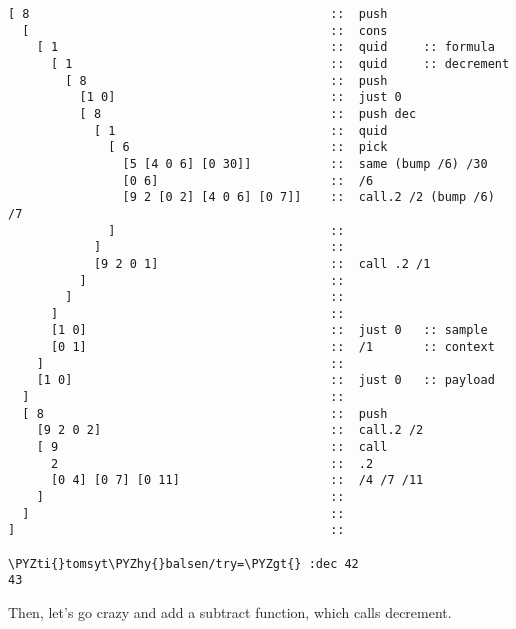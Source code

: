 \begin{framed_shaded}
\begin{Verbatim}[fontsize=\relsize{-2.5},fontseries=b,commandchars=\\\{\}]
[ 8                                          ::  push
  [                                          ::  cons
    [ 1                                      ::  quid     :: formula
      [ 1                                    ::  quid     :: decrement
        [ 8                                  ::  push
          [1 0]                              ::  just 0
          [ 8                                ::  push dec
            [ 1                              ::  quid
              [ 6                            ::  pick
                [5 [4 0 6] [0 30]]           ::  same (bump /6) /30
                [0 6]                        ::  /6
                [9 2 [0 2] [4 0 6] [0 7]]    ::  call.2 /2 (bump /6) /7
              ]                              ::
            ]                                :: 
            [9 2 0 1]                        ::  call .2 /1
          ]                                  ::
        ]                                    ::
      ]                                      ::
      [1 0]                                  ::  just 0   :: sample
      [0 1]                                  ::  /1       :: context
    ]                                        ::
    [1 0]                                    ::  just 0   :: payload
  ]                                          ::
  [ 8                                        ::  push
    [9 2 0 2]                                ::  call.2 /2
    [ 9                                      ::  call
      2                                      ::  .2
      [0 4] [0 7] [0 11]                     ::  /4 /7 /11
    ]                                        ::
  ]                                          ::
]                                            ::
                  
\PYZti{}tomsyt\PYZhy{}balsen/try=\PYZgt{} :dec 42
43
\end{Verbatim}
\end{framed_shaded}
Then, let's go crazy and add a subtract function, which calls
decrement.

